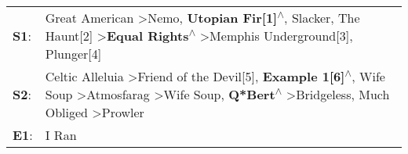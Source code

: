 \begin{supertabular}{p{0.03\textwidth}p{0.92\textwidth}}
 \textbf{S1}:  &                                                                                                     Great American\textsuperscript{} \textgreater \enspace Nemo\textsuperscript{}, \enspace \textbf{Utopian Fir[1]\textsuperscript{$\wedge$}}, \enspace Slacker\textsuperscript{}, \enspace The Haunt[2]\textsuperscript{} \textgreater \enspace \textbf{Equal Rights\textsuperscript{$\wedge$}} \textgreater \enspace Memphis Underground[3]\textsuperscript{}, \enspace Plunger[4]\textsuperscript{}  \enspace  \\
 \textbf{S2}:  &  Celtic Alleluia\textsuperscript{} \textgreater \enspace Friend of the Devil[5]\textsuperscript{}, \enspace \textbf{Example 1[6]\textsuperscript{$\wedge$}}, \enspace Wife Soup\textsuperscript{} \textgreater \enspace Atmosfarag\textsuperscript{} \textgreater \enspace Wife Soup\textsuperscript{}, \enspace \textbf{Q*Bert\textsuperscript{$\wedge$}} \textgreater \enspace Bridgeless\textsuperscript{}, \enspace Much Obliged\textsuperscript{} \textgreater \enspace Prowler\textsuperscript{}  \enspace  \\
 \textbf{E1}:  &                                                                                                                                                                                                                                                                                                                                                                                                                                                                                I Ran\textsuperscript{}  \enspace  \\
\end{supertabular}
